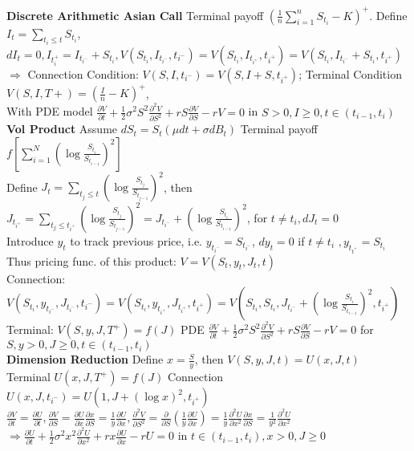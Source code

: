 \documentclass[12pt,landscape, a4paper]{article}
\theoremstyle{remark}
\newcommand{\dd}{\partial}
\begin{document}
\begin{multicols*}{3}
\textbf{Discrete Arithmetic Asian Call} Terminal payoff $\left(\frac{1}{n}\sum^n_{i=1} S_{t_i} -K\right)^+$. 
Define $I_t = \sum_{t_i \leq t} S_{t_i}$, $d I
_t = 0, I_{t_i^+} = I_{t_{i^-}} +S_{t_i}, V(S_{t_{i}}, I_{t_{i^-}}, t_{i^-}) = V(S_{t_{i}}, I_{t_{i^+}}, t_{i^+}) = V(S_{t_{i}}, I_{t_{i^-}} + S_{t_i}, t_{i^+})$\\
$\Rightarrow$ Connection Condition: $V(S, I, t_{i^-}) = V (S, I+S, t_{i^+})$; Terminal Condition $V(S, I, T+) = \left(\frac{I}{n} - K \right)^+$, \\
With PDE model $ \frac{\dd V}{\dd t}+ \frac{1}{2} \sigma^2 S^2 \frac{\dd^2 V}{\dd S^2} + rS \frac{\dd V}{\dd S} -rV = 0$ in $S>0, I \geq 0, t \in (t_{i-1}, t_i)$\\

\textbf{Vol Product} Assume $d S_t = S_t (\mu dt + \sigma dB_t)$ Terminal payoff $f \left[\sum^N_{i=1} \left(\log \frac{S_{t_i}}{S_{t_{i-1}}} \right)^2 \right]$  \\
Define $J_t = \sum_{t_j \leq t} \left(\log \frac{S_{t_j}}{S_{t_{j-1}}} \right)^2 $, then $J_{t_{i^+}} = \sum_{t_j \leq t_{i^+}}  \left(\log \frac{S_{t_j}}{S_{t_{j-1}}} \right)^2 = J_{t_{i^-}} + \left(\log \frac{S_{t_i}}{S_{t_{i -1}}} \right)^2$, for $t \neq t_i, d J_t = 0$\\
Introduce $y_t$ to track previous price, i.e. $y_{t_{i^-}} = S_{t_{i^-}}$, $d y_t = 0$ if $t\neq t_i$ $, y_{t_{t^+}} = S_{t_i}$\\
Thus pricing func. of this product: $V = V(S_t, y_t, J_t, t)$\\
Connection: $V (S_{t_i}, y_{t_{i^-}}, J_{t_{i^-}}, t_{i^-}) = V (S_{t_i}, y_{t_{i^+}}, J_{t_{i^+}}, t_{i^+}) = V(S_{t_i}, S_{t_i}, J_{t_{i^-}} + \left(\log \frac{S_{t_i}}{S_{t_{i -1}}} \right)^2, t_{i^+} ) $\\
Terminal: $V(S, y, J, T^+) = f(J)$ PDE $\frac{\dd V}{\dd t}+ \frac{1}{2} \sigma^2 S^2 \frac{\dd^2 V}{\dd S^2} + rS \frac{\dd V}{\dd S} -rV = 0 $ for $S, y >0, J \geq 0, t\in (t_{i-1}, t_i)$\\
\textbf{Dimension Reduction} Define $x = \frac{S}{y}$, then $V(S, y, J, t) = U (x, J, t)$ \\
Terminal $U(x, J, T^+) = f(J)$ Connection $U (x, J, t_{i^-}) = U (1, J +(\log x)^2 , t_{i^+})$\\
$\frac{\dd V}{\dd t} = \frac{\dd U}{\dd t}, \frac{\dd V}{\dd S} = \frac{\dd U}{\dd x} \frac{\dd x}{\dd S} = \frac{1}{y} \frac{\dd U}{\dd x}, \frac{\dd^2 V}{\dd S^2} = \frac{\dd}{\dd S} \left(\frac{1}{y} \frac{\dd U}{\dd x}  \right) = \frac{1}{y} \frac{\dd^2 U}{\dd x^2} \frac{\dd x}{\dd S} = \frac{1}{y^2} \frac{\dd^2 U}{\dd x^2}  $\\
$\Rightarrow \frac{\dd U}{\dd t} + \frac{1}{2} \sigma^2 x^2 \frac{\dd^2 U}{\dd x^2} + rx \frac{\dd U}{\dd x} - rU = 0$ in $t\in (t_{i-1}, t_i), x>0, J \geq 0$\\


\end{multicols*}
\end{document}
